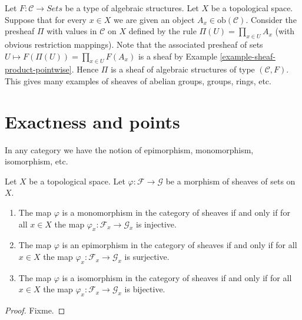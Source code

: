 \begin{example}
\label{example-sheaf-product-pointwise-algebraic-structure}
Let $F : \mathcal{C} \to \textit{Sets}$ be a
type of algebraic structures.
Let $X$ be a topological space. Suppose that
for every $x \in X$ we are given an object
$A_x \in \text{ob}(\mathcal{C})$. Consider the presheaf
$\Pi$ with values in $\mathcal{C}$ on $X$ defined by the rule
$\Pi(U) = \prod_{x \in U} A_x$ (with obvious restriction
mappings). Note that the associated presheaf of sets
$U \mapsto F(\Pi(U)) = \prod_{x \in U} F(A_x)$ is a sheaf
by Example \ref{example-sheaf-product-pointwise}.
Hence $\Pi$ is a sheaf of algebraic structures
of type $(\mathcal{C} , F)$. This gives many examples
of sheaves of abelian groups, groups, rings, etc.
\end{example}













\section{Exactness and points}
\label{section-exactness-points}

\noindent
In any category we have the notion of epimorphism, monomorphism,
isomorphism, etc.

\begin{lemma}
\label{lemma-points-exactness}
Let $X$ be a topological space. Let $\varphi : \mathcal{F} \to \mathcal{G}$
be a morphism of sheaves of sets on $X$.
\begin{enumerate}
\item The map $\varphi$ is a monomorphism in the category of sheaves
if and only if for all $x \in X$ the map
$\varphi_x : \mathcal{F}_x \to \mathcal{G}_x$
is injective.
\item The map $\varphi$ is an epimorphism in the category of sheaves
if and only if for all $x \in X$ the map
$\varphi_x : \mathcal{F}_x \to \mathcal{G}_x$
is surjective.
\item The map $\varphi$ is a isomorphism in the category of sheaves
if and only if for all $x \in X$ the map
$\varphi_x : \mathcal{F}_x \to \mathcal{G}_x$
is bijective.
\end{enumerate}
\end{lemma}

\begin{proof}
Fixme.
\end{proof}

